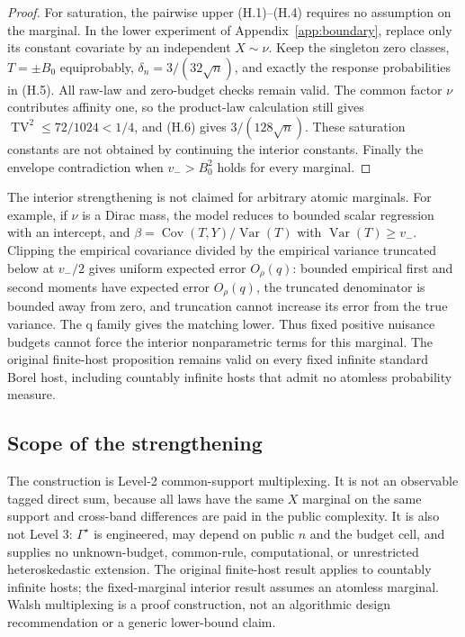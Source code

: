 \begin{proof}
For saturation, the pairwise upper (H.1)--(H.4) requires no assumption on
the marginal.  In the lower experiment of Appendix~\ref{app:boundary},
replace only its constant covariate by an independent \(X\sim\nu\).
Keep the singleton zero classes, \(T=\pm B_0\) equiprobably,
\(\delta_n=3/(32\sqrt n)\), and exactly the response probabilities
in (H.5).  All raw-law and zero-budget checks remain valid.  The common
factor \(\nu\) contributes affinity one, so the product-law calculation
still gives \(\operatorname{TV}^2\le72/1024<1/4\), and (H.6) gives
\(3/(128\sqrt n)\).  These saturation constants are not obtained by
continuing the interior constants.  Finally the envelope contradiction
when \(v_->B_0^2\) holds for every marginal.
\end{proof}

The interior strengthening is not claimed for arbitrary atomic marginals.
For example,
if \(\nu\) is a Dirac mass, the model reduces to bounded scalar regression
with an intercept, and \(\beta=\operatorname{Cov}(T,Y)/\operatorname{Var}(T)\)
with \(\operatorname{Var}(T)\ge v_-\).  Clipping the empirical covariance
divided by the empirical variance truncated below at \(v_-/2\) gives
uniform expected error \(O_\rho(q)\): bounded empirical first and second
moments have expected error \(O_\rho(q)\), the truncated denominator is
bounded away from zero, and truncation cannot increase its error from the
true variance.  The q family gives the matching lower.  Thus fixed
positive nuisance budgets cannot force the interior nonparametric terms
for this marginal.  The original finite-host proposition remains valid
on every fixed infinite standard Borel host, including countably infinite
hosts that admit no atomless probability measure.

\subsection{Scope of the strengthening}

The construction is Level-2 common-support multiplexing.  It is not an
observable tagged direct sum, because all laws have the same \(X\) marginal
on the same support and cross-band differences are paid in the public
complexity.  It is also not Level 3: \(\Gamma^\star\) is engineered, may
depend on public \(n\) and the budget cell, and supplies no unknown-budget,
common-rule, computational, or unrestricted heteroskedastic extension.
The original finite-host result applies to countably infinite hosts; the
fixed-marginal interior result assumes an atomless marginal.  Walsh multiplexing is a proof construction, not an algorithmic
design recommendation or a generic lower-bound claim.
